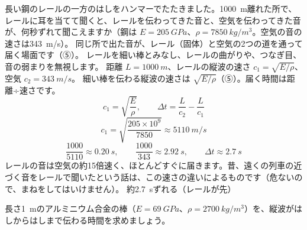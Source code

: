 \label{ph:波-5:ex8}
\begin{phreidai}[レールに耳を当てると]
長い鋼のレールの一方のはしをハンマーでたたきました。\qty{1000}{m}離れた所で、レールに耳を当てて聞くと、レールを伝わってきた音と、空気を伝わってきた音が、何秒ずれて聞こえますか（鋼は $E=\qty{205}{GPa}$、$\rho=\qty{7850}{kg/m^3}$。空気の音の速さは\qty{343}{m/s}）。
\phbamen
同じ所で出た音が、レール（固体）と空気の2つの道を通って届く場面です（⑤）。
\phmushi
レールを細い棒とみなし、レールの曲がりや、つなぎ目、音の弱まりを無視します。
\phzu
距離 $L=\qty{1000}{m}$、レールの縦波の速さ $c_1=\sqrt{E/\rho}$、空気 $c_2=\qty{343}{m/s}$。
\phriyu
細い棒を伝わる縦波の速さは $\sqrt{E/\rho}$（⑤）。届く時間は距離÷速さです。
\phtateru
\[c_1=\sqrt{\frac{E}{\rho}},\qquad\Delta t=\frac{L}{c_2}-\frac{L}{c_1}\]
\phtoku
\[c_1=\sqrt{\frac{205\times10^9}{7850}}\approx\qty{5110}{m/s}\]
\[\frac{1000}{5110}\approx\qty{0.20}{s},\qquad\frac{1000}{343}\approx\qty{2.92}{s},\qquad\Delta t\approx\qty{2.7}{s}\]
\phtashikame
レールの音は空気の約15倍速く、ほとんどすぐに届きます。昔、遠くの列車の近づく音をレールで聞いたという話は、この速さの違いによるものです（危ないので、まねをしてはいけません）。
\kotae 約\qty{2.7}{s}ずれる（レールが先）
\end{phreidai}
\begin{jibun}
長さ\qty{1}{m}のアルミニウム合金の棒（$E=\qty{69}{GPa}$、$\rho=\qty{2700}{kg/m^3}$）を、縦波がはしからはしまで伝わる時間を求めましょう。
\end{jibun}

